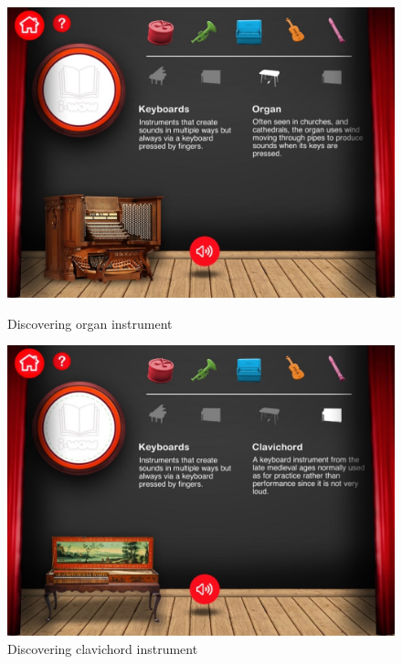 \begin{figure}[ht!]
  \centering
  \includegraphics[width=350pt]{graphics/additional-screens/discovering_key_organ_screen.jpg}
  \vspace{0.05cm}
  \caption{Discovering organ instrument}
  \vspace{0.6cm}

  \includegraphics[width=350pt]{graphics/additional-screens/discovering_key_clavichord_screen.jpg}
  \vspace{0.05cm}
  \caption{Discovering clavichord instrument}
\end{figure}

